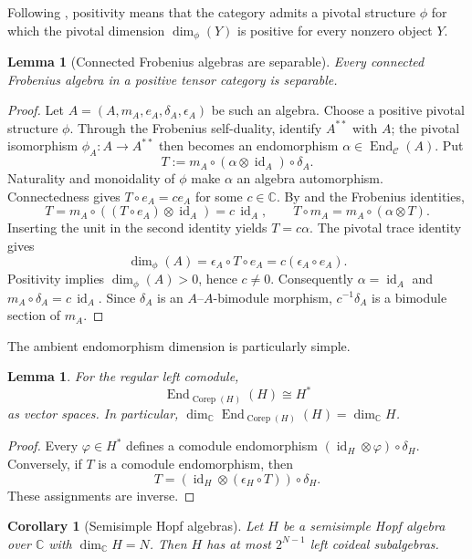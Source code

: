 \documentclass[11pt]{amsart}
\newtheorem{lemma}[theorem]{Lemma}
\newtheorem{corollary}[theorem]{Corollary}
\theoremstyle{definition}
\theoremstyle{remark}
\newcommand{\C}{\mathcal C}
\newcommand{\CC}{\mathbb C}
\DeclareMathOperator{\End}{End}
\DeclareMathOperator{\Corep}{Corep}
\DeclareMathOperator{\id}{id}
\begin{document}
Following \cite[Definition~6.3]{GhoshPalcouxLattices}, positivity means that
the category admits a pivotal structure $\phi$ for which the pivotal
dimension $\dim_{\phi}(Y)$ is positive for every nonzero object $Y$.

\begin{lemma}[Connected Frobenius algebras are separable]
\label{lem:positive-frobenius-separable}
Every connected Frobenius algebra in a positive tensor category is
separable.
\end{lemma}

\begin{proof}
Let $A=(A,m_A,e_A,\delta_A,\epsilon_A)$ be such an algebra.  Choose a
positive pivotal structure $\phi$.  Through the Frobenius self-duality,
identify $A^{**}$ with $A$; the pivotal isomorphism
$\phi_A:A\to A^{**}$ then becomes an endomorphism
$\alpha\in\End_{\C}(A)$.  Put
\[
 T:=m_A\circ(\alpha\otimes\id_A)\circ\delta_A.
\]
Naturality and monoidality of $\phi$ make $\alpha$ an algebra automorphism.
Connectedness gives $T\circ e_A=c e_A$ for some $c\in\CC$.  By
\cite[Lemma~2.14]{GhoshPalcouxLattices} and the Frobenius identities,
\[
 T=m_A\circ((T\circ e_A)\otimes\id_A)=c\,\id_A,
 \qquad
 T\circ m_A=m_A\circ(\alpha\otimes T).
\]
Inserting the unit in the second identity yields $T=c\alpha$.  The pivotal
trace identity \cite[Lemmas~2.23--2.24]{GhoshPalcouxLattices} gives
\[
 \dim_{\phi}(A)=\epsilon_A\circ T\circ e_A
 =c(\epsilon_A\circ e_A).
\]
Positivity implies $\dim_{\phi}(A)>0$, hence $c\ne0$.  Consequently
$\alpha=\id_A$ and $m_A\circ\delta_A=c\,\id_A$.  Since $\delta_A$ is an
$A$--$A$-bimodule morphism, $c^{-1}\delta_A$ is a bimodule section of
$m_A$.
\end{proof}

The ambient endomorphism dimension is particularly simple.

\begin{lemma}\label{lem:regular-endomorphisms}
For the regular left comodule,
\[
 \End_{\Corep(H)}(H)\cong H^*
\]
as vector spaces.  In particular,
$\dim_{\CC}\End_{\Corep(H)}(H)=\dim_{\CC}H$.
\end{lemma}

\begin{proof}
Every $\varphi\in H^*$ defines a comodule endomorphism
$(\id_H\otimes\varphi)\circ\delta_H$.  Conversely, if $T$ is a comodule
endomorphism, then
\[
 T=(\id_H\otimes(\epsilon_H\circ T))\circ\delta_H.
\]
These assignments are inverse.
\end{proof}

\begin{corollary}[Semisimple Hopf algebras]\label{cor:hopf-bound}
Let $H$ be a semisimple Hopf algebra over $\CC$ with
$\dim_{\CC}H=N$.  Then $H$ has at most $2^{N-1}$ left coideal subalgebras.
\end{corollary}
\end{document}
